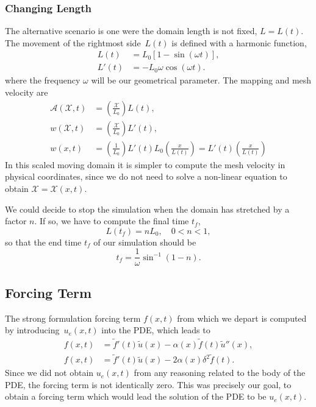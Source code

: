\documentclass[../main.tex]{subfiles}
\newcommand{\alemap}{\ensuremath{\mathcal{A}}}
\newcommand{\aleX}{\ensuremath{\mathcal{X}}}
\begin{document}
\subsubsection{Changing Length}
The alternative scenario is one were the domain length is not fixed, $L=L(t)$.
The movement of the rightmost side~$L(t)$ is defined with a harmonic function, 
\begin{subequations}
    \begin{align}
        L(t) &= L_0 \left[1 - \sin\left(\omega t\right)\right], \\
        L'(t) &= - L_0 \omega \cos(\omega t).
    \end{align}
\end{subequations}
where the frequency $\omega$ will be our geometrical parameter.
The mapping and mesh velocity are
\begin{subequations}
    \begin{align}
        \alemap(\aleX, t) &= \left(\frac{\aleX}{L_0}\right) L(t), \\
        w(\aleX, t) &= \left(\frac{\aleX}{L_0}\right) L'(t), \\
        w(x, t) &= \left(\frac{1}{L_0}\right) L'(t) {L_0} \left(\frac{x}{L(t)}\right) =
        L'(t)\left(\frac{x}{L(t)}\right)
    \end{align}
\end{subequations}
In this scaled moving domain it is simpler to compute the mesh velocity in physical coordinates, since we do not need to solve a non-linear equation to obtain $\aleX = \aleX(x,t)$. 

We could decide to stop the simulation when the domain has stretched by a factor $n$.
If so, we have to compute the final time $t_f$,
\begin{equation}
    L(t_f) = n L_0, \quad 0 < n < 1,
\end{equation}
so that the end time $t_f$ of our simulation should be
\begin{equation}
    t_f = \frac{1}{\omega} \sin^{-1}\left(1 - n\right).
\end{equation}

\subsection{Forcing Term}
The strong formulation forcing term $f(x,t)$ from which we depart is computed by introducing~$u_e(x,t)$ into the PDE, which leads to
\begin{subequations}
    \label{eq:1d_fom_mfp_forcing_term}
    \begin{align}
        f(x,t) &= \tilde{f}'(t) \tilde{u}(x) - \alpha(x) \tilde{f}(t) \tilde{u}''(x), \\
        f(x,t) &= \tilde{f}'(t) \tilde{u}(x) - 2 \alpha(x) \delta^2 \tilde{f}(t).
    \end{align}
\end{subequations}
Since we did not obtain $u_e(x,t)$ from any reasoning related to the body of the PDE, 
the forcing term is not identically zero.
This was precisely our goal, to obtain a forcing term which would lead the solution of the PDE to be $u_e(x,t)$. 
\end{document}
